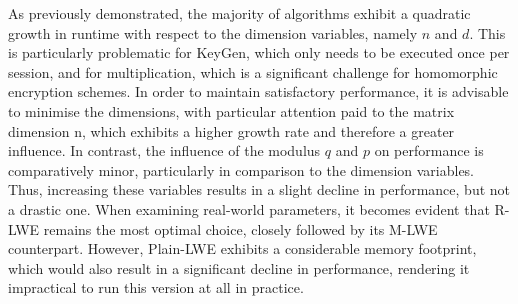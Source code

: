 As previously demonstrated, the majority of algorithms exhibit a quadratic growth in runtime with respect to the dimension variables, namely $n$ and $d$. This is particularly problematic for KeyGen, which only needs to be executed once per session, and for multiplication, which is a significant challenge for homomorphic encryption schemes. In order to maintain satisfactory performance, it is advisable to minimise the dimensions, with particular attention paid to the matrix dimension n, which exhibits a higher growth rate and therefore a greater influence. In contrast, the influence of the modulus $q$ and $p$ on performance is comparatively minor, particularly in comparison to the dimension variables. Thus, increasing these variables results in a slight decline in performance, but not a drastic one. When examining real-world parameters, it becomes evident that R-LWE remains the most optimal choice, closely followed by its M-LWE counterpart. However, Plain-LWE exhibits a considerable memory footprint, which would also result in a significant decline in performance, rendering it impractical to run this version at all in practice. 





